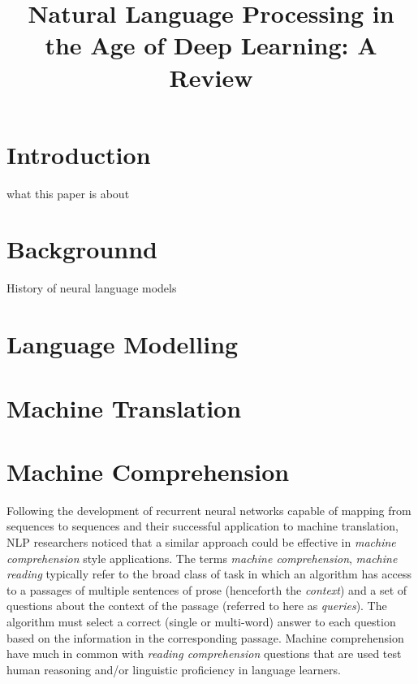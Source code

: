 \documentclass[11pt,letterpaper]{article}
\title{Natural Language Processing in the Age of Deep Learning: A Review}
\date{}
\begin{document}
\maketitle

\begin{abstract}

\end{abstract}


\section{Introduction}
what this paper is about

\section{Backgrounnd}

History of neural language models

\cite{miikkulainen1993subsymbolic}

\section{Language Modelling}

\section{Machine Translation}

\section{Machine Comprehension}

Following the development of recurrent neural networks capable of mapping from sequences to sequences and their successful application to machine translation, NLP researchers noticed that a similar approach could be effective in \emph{machine comprehension} style applications. The terms \emph{machine comprehension}, \emph{machine reading} typically refer to the broad class of task in which an algorithm has access to a passages of multiple sentences of prose (henceforth the \emph{context}) and a set of questions about the context of the passage (referred to here as \emph{queries}). The algorithm must select a correct (single or multi-word) answer to each question based on the information in the corresponding passage.  Machine comprehension have much in common with \emph{reading comprehension} questions that are used test human reasoning and/or linguistic proficiency in language learners. 
\end{document}
